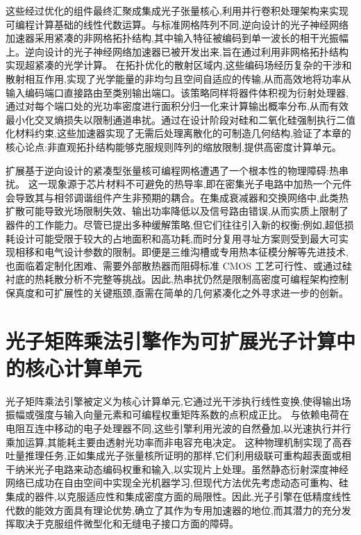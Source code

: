 \documentclass[11pt]{article}
\begin{document}
这些经过优化的组件最终汇聚成集成光子张量核心,利用并行卷积处理架构来实现可编程计算基础的线性代数运算。与标准网格阵列不同,逆向设计的光子神经网络加速器采用紧凑的非网格拓扑结构,其中输入特征被编码到单一波长的相干光振幅上。逆向设计的光子神经网络加速器已被开发出来,旨在通过利用非网格拓扑结构实现超紧凑的光学计算。\citep{doi_10_1038_s41467_026_68648_1_26658a9c} 在拓扑优化的散射区域内,这些编码场经历复杂的干涉和散射相互作用,实现了光学能量的非均匀且空间自适应的传输,从而高效地将功率从输入编码端口直接路由至类别输出端口。该策略同样将器件体积视为衍射处理器,通过对每个端口处的光功率密度进行面积分归一化来计算输出概率分布,从而有效最小化交叉熵损失以限制通道串扰。通过在设计阶段对硅和二氧化硅强制执行二值化材料约束,这些加速器实现了无需后处理离散化的可制造几何结构,验证了本章的核心论点:非直观拓扑结构能够克服规则阵列的缩放限制,提供高密度计算单元。\citep{doi_10_1515_nanoph_2022_0423_38a2c3ec} \citep{doi_10_1038_s41467_026_68648_1_26658a9c}

扩展基于逆向设计的紧凑型张量核可编程网格遭遇了一个根本性的物理障碍:热串扰。\citep{doi_10_1109_access_2020_3013116_8fec1fb2} 这一现象源于芯片材料不可避免的热导率,即在密集光子电路中加热一个元件会导致其与相邻调谐组件产生非预期的耦合。在集成衰减器和交换网络中,此类热扩散可能导致光场限制失效、输出功率降低以及信号路由错误,从而实质上限制了器件的工作能力。尽管已提出多种缓解策略,但它们往往引入新的权衡;例如,超低损耗设计可能受限于较大的占地面积和高功耗,而时分复用寻址方案则受到最大可实现相移和电气设计参数的限制。即便是三维沟槽或专用热本征模分解等先进技术,也面临着定制化困难、需要外部散热器而阻碍标准 CMOS 工艺可行性、或通过硅衬底的热耗散分析不完整等挑战。因此,热串扰仍然是限制高密度可编程架构控制保真度和可扩展性的关键瓶颈,亟需在简单的几何紧凑化之外寻求进一步的创新。\citep{doi_10_1109_access_2020_3013116_8fec1fb2}

\section{光子矩阵乘法引擎作为可扩展光子计算中的核心计算单元}\label{ux5149ux5b50ux77e9ux9635ux4e58ux6cd5ux5f15ux64ceux4f5cux4e3aux53efux6269ux5c55ux5149ux5b50ux8ba1ux7b97ux4e2dux7684ux6838ux5fc3ux8ba1ux7b97ux5355ux5143}

光子矩阵乘法引擎被定义为核心计算单元,它通过光干涉执行线性变换,使得输出场振幅或强度与输入向量元素和可编程权重矩阵系数的点积成正比。\citep{doi_10_1109_hpca57654_2024_00059_f488ee7a} 与依赖电荷在电阻互连中移动的电子处理器不同,这些引擎利用光波的自然叠加,以光速执行并行乘加运算,其能耗主要由透射光功率而非电容充电决定。\citep{doi_10_1109_icop56156_2022_9911729_8d67554d} \citep{doi_10_1145_3716368_3735243_93c8da73} 这种物理机制实现了高吞吐量推理任务,正如集成光子张量核所证明的那样,它们利用级联可重构超表面或相干纳米光子电路来动态编码权重和输入,以实现片上处理。虽然静态衍射深度神经网络已成功在自由空间中实现全光机器学习,但现代方法优先考虑动态可重构、硅集成的器件,以克服适应性和集成密度方面的局限性。因此,光子引擎在低精度线性代数的能效方面具有理论优势,确立了其作为专用加速器的地位,而其潜力的充分发挥取决于克服组件微型化和无缝电子接口方面的障碍。\citep{doi_10_1088_1402_4896_ae8345_3b948559} \citep{doi_10_1515_nanoph_2022_0423_38a2c3ec} \citep{doi_10_3390_nano14080697_c372a140}
\end{document}
